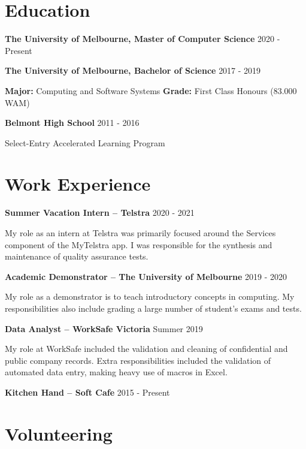 \documentclass[10pt]{article}
\newcommand{\entry}[3]{
    \textbf{#1} \newline
    {\footnotesize #2}
    \begin{flushleft}
        #3
    \end{flushleft}
}
\begin{document}
\begin{minipage}[t]{.60\textwidth}
\vspace*{0pt}

\section{Education}

\entry{The University of Melbourne, Master of Computer Science}
{2020 - Present}
{}

\entry{The University of Melbourne, Bachelor of Science}
{2017 - 2019}
{
    \textbf{Major:} Computing and Software Systems \newline
    \textbf{Grade:} First Class Honours (83.000 WAM) \newline
}

\entry{Belmont High School}
{2011 - 2016}
{Select-Entry Accelerated Learning Program}

\medskip

\section{Work Experience}

\entry{Summer Vacation Intern -- Telstra}
{2020 - 2021}
{
    My role as an intern at Telstra was primarily focused around the Services component of the MyTelstra app.
    I was responsible for the synthesis and maintenance of quality assurance tests. \newline
}

\entry{Academic Demonstrator -- The University of Melbourne}
{2019 - 2020}
{
    My role as a demonstrator is to teach introductory concepts in computing.
    My responsibilities also include grading a large number of student's exams and tests. \newline
}

\entry{Data Analyst -- WorkSafe Victoria}
{Summer 2019}
{
    My role at WorkSafe included the validation and cleaning of confidential and public company records. 
    Extra responsibilities included the validation of automated data entry, making heavy use of macros in Excel. \newline
}

\entry{Kitchen Hand -- Soft Cafe}
{2015 - Present}
{}

\medskip

\section{Volunteering}


\end{minipage}
\end{document}
